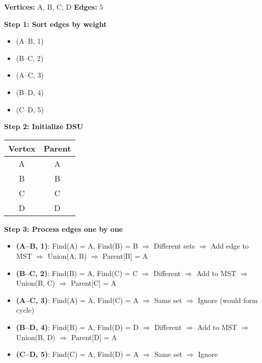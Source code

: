 \documentclass[14pt,a4paper]{extarticle}
\begin{document}
\textbf{Vertices:} A, B, C, D \hfill \textbf{Edges:} 5

\vspace{1em}
\textbf{Step 1: Sort edges by weight}

\begin{itemize}
  \item (A--B, 1)
  \item (B--C, 2)
  \item (A--C, 3)
  \item (B--D, 4)
  \item (C--D, 5)
\end{itemize}

\vspace{1em}
\textbf{Step 2: Initialize DSU}

\begin{center}
\begin{tabular}{|c|c|}
\hline
Vertex & Parent \\
\hline
A & A \\
B & B \\
C & C \\
D & D \\
\hline
\end{tabular}
\end{center}

\vspace{1em}
\textbf{Step 3: Process edges one by one}

\begin{itemize}
  \item \textbf{(A--B, 1)}: Find(A) = A, Find(B) = B $\Rightarrow$ Different sets $\Rightarrow$ Add edge to MST  
  \quad $\Rightarrow$ Union(A, B) $\Rightarrow$ Parent[B] = A

  \item \textbf{(B--C, 2)}: Find(B) = A, Find(C) = C $\Rightarrow$ Different $\Rightarrow$ Add to MST  
  \quad $\Rightarrow$ Union(B, C) $\Rightarrow$ Parent[C] = A

  \item \textbf{(A--C, 3)}: Find(A) = A, Find(C) = A $\Rightarrow$ Same set $\Rightarrow$ Ignore (would form cycle)

  \item \textbf{(B--D, 4)}: Find(B) = A, Find(D) = D $\Rightarrow$ Different $\Rightarrow$ Add to MST  
  \quad $\Rightarrow$ Union(B, D) $\Rightarrow$ Parent[D] = A

  \item \textbf{(C--D, 5)}: Find(C) = A, Find(D) = A $\Rightarrow$ Same set $\Rightarrow$ Ignore
\end{itemize}
\end{document}
